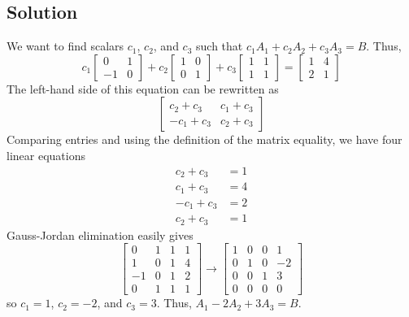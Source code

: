 \subsection*{Solution}
We want to find scalars $c_1$, $c_2$, and $c_3$ such that $c_1A_1+c_2A_2+c_3A_3=B$. Thus,
\[
    c_1\begin{bmatrix}
        0  & 1 \\
        -1 & 0
    \end{bmatrix}+
    c_2\begin{bmatrix}
        1 & 0 \\
        0 & 1
    \end{bmatrix}+
    c_3\begin{bmatrix}
        1 & 1 \\
        1 & 1
    \end{bmatrix}=
    \begin{bmatrix}
        1 & 4 \\
        2 & 1
    \end{bmatrix}
\]
The left-hand side of this equation can be rewritten as
\[\begin{bmatrix}
        c_2+c_3  & c_1+c_3 \\
        -c_1+c_3 & c_2+c_3
    \end{bmatrix}\]
Comparing entries and using the definition of the matrix equality, we have four linear equations
\begin{align*}
    c_2+c_3  & =1 \\
    c_1+c_3  & =4 \\
    -c_1+c_3 & =2 \\
    c_2+c_3  & =1
\end{align*}
Gauss-Jordan elimination easily gives
\[
    \left[\begin{array}{ccc|c}
            0  & 1 & 1 & 1 \\
            1  & 0 & 1 & 4 \\
            -1 & 0 & 1 & 2 \\
            0  & 1 & 1 & 1
        \end{array}\right]\to
    \left[\begin{array}{ccc|c}
            1 & 0 & 0 & 1  \\
            0 & 1 & 0 & -2 \\
            0 & 0 & 1 & 3  \\
            0 & 0 & 0 & 0
        \end{array}\right]
\]
so $c_1=1$, $c_2=-2$, and $c_3=3$. Thus, $A_1-2A_2+3A_3=B$.

